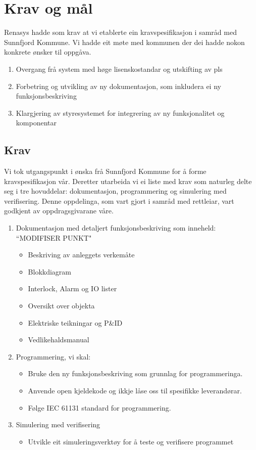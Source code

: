 \chapter{Krav og mål}
\thispagestyle{fancy}
\gls{Renasys} hadde som krav at vi etablerte ein kravspesifikasjon i samråd med \gls{Sunnfjord Kommune}.
Vi hadde eit møte med kommunen der dei hadde nokon konkrete ønsker til oppgåva.

\begin{enumerate}
    \item Overgang frå system med høge lisenskostandar og utskifting av pls
    \item Forbetring og utvikling av ny dokumentasjon, som inkludera ei ny funksjonsbeskriving 
    \item Klargjering av styresystemet for integrering av ny funksjonalitet og komponentar
\end{enumerate}

\section{Krav}
Vi tok utgangspunkt i ønska frå \gls{Sunnfjord Kommune} for å forme kravspesifikasjon vår.
Deretter utarbeida vi ei liste med krav som naturleg delte seg i tre
hovuddelar: dokumentasjon, programmering og simulering med verifisering. Denne oppdelinga, som vart gjort i samråd med rettleiar, 
vart godkjent av oppdragsgivarane våre.

\begin{enumerate}
    \item Dokumentasjon med detaljert funksjonsbeskriving som inneheld: “MODIFISER PUNKT"
        \begin{itemize} 
        \item Beskriving av anleggets verkemåte
        \item Blokkdiagram
        \item Interlock, Alarm og IO lister
        \item Oversikt over objekta
        \item Elektriske teikningar og P\&ID
        \item Vedlikehaldsmanual
        \end{itemize}
    \item Programmering, vi skal:
        \begin{itemize}
        \item Bruke den ny funksjonsbeskriving som grunnlag for programmeringa.
        \item Anvende open kjeldekode og ikkje låse oss til spesifikke leverandørar.
        \item Følge \gls{IEC} 61131 standard for programmering.
        \end{itemize}
    \item Simulering med verifisering
        \begin{itemize}
        \item Utvikle eit simuleringsverktøy for å teste og verifisere programmet
        \end{itemize}
\end{enumerate}

